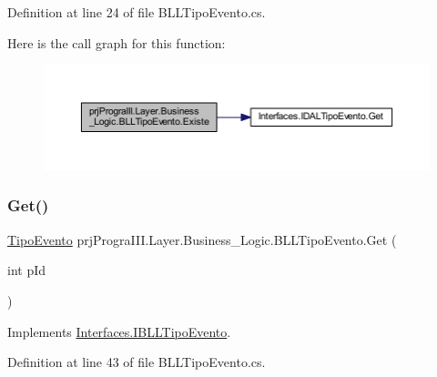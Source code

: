 Definition at line 24 of file B\+L\+L\+Tipo\+Evento.\+cs.

Here is the call graph for this function\+:
\nopagebreak
\begin{figure}[H]
\begin{center}
\leavevmode
\includegraphics[width=350pt]{classprj_progra_i_i_i_1_1_layer_1_1_business___logic_1_1_b_l_l_tipo_evento_a19a88b8e91a1e842f44708080b09f8c5_cgraph}
\end{center}
\end{figure}
\hypertarget{classprj_progra_i_i_i_1_1_layer_1_1_business___logic_1_1_b_l_l_tipo_evento_ad78fc8f36ab176729080a6720f1627d5}{}\label{classprj_progra_i_i_i_1_1_layer_1_1_business___logic_1_1_b_l_l_tipo_evento_ad78fc8f36ab176729080a6720f1627d5} 
\subsubsection{\texorpdfstring{Get()}{Get()}}
{\footnotesize\ttfamily \hyperlink{classprj_progra_i_i_i_1_1_layer_1_1_entities_1_1_tipo_evento}{Tipo\+Evento} prj\+Progra\+I\+I\+I.\+Layer.\+Business\+\_\+\+Logic.\+B\+L\+L\+Tipo\+Evento.\+Get (\begin{DoxyParamCaption}\item[{int}]{p\+Id }\end{DoxyParamCaption})}



Implements \hyperlink{interface_interfaces_1_1_i_b_l_l_tipo_evento_afa587820875ec8c611cb628c33a3a274}{Interfaces.\+I\+B\+L\+L\+Tipo\+Evento}.



Definition at line 43 of file B\+L\+L\+Tipo\+Evento.\+cs.

